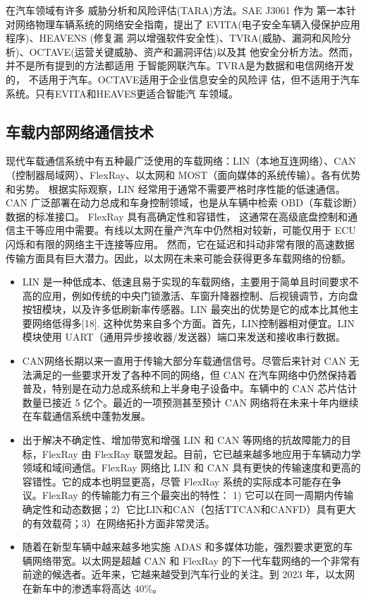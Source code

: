 在汽车领域有许多
威胁分析和风险评估(TARA)方法。SAE J3061
\cite{sae2016cybersecurity}作为
第一本针对网络物理车辆系统的网络安全指南，提出了
EVITA(电子安全车辆入侵保护应用程序)、HEAVENS (修复漏
洞以增强软件安全性)、TVRA(威胁、漏洞和风险分
析)、OCTAVE(运营关键威胁、资产和漏洞评估)以及其
他安全分析方法。然而，并不是所有提到的方法都适用
于智能网联汽车。TVRA是为数据和电信网络开发的，
不适用于汽车。OCTAVE适用于企业信息安全的风险评
估，但不适用于汽车系统。只有EVITA和HEAVES更适合智能汽
车领域。

\subsection{车载内部网络通信技术}
现代车载通信系统中有五种最广泛使用的车载网络：LIN（本地互连网络）、CAN（控制器局域网）、FlexRay、以太网和 MOST（面向媒体的系统传输）。各有优势和劣势。
根据实际观察，LIN 经常用于通常不需要严格时序性能的低速通信。CAN 广泛部署在动力总成和车身控制领域，也是从车辆中检索 OBD（车载诊断）数据的标准接口。
FlexRay 具有高确定性和容错性，
这通常在高级底盘控制和通信主干等应用中需要。有线以太网在量产汽车中仍然相对较新，可能仅用于 ECU 闪烁和有限的网络主干连接等应用。
然而，它在延迟和抖动非常有限的高速数据传输方面具有巨大潜力。因此，以太网在未来可能会获得更多车载网络的份额。

\begin{itemize}
    \item LIN 是一种低成本、低速且易于实现的车载网络，主要用于简单且时间要求不高的应用，例如传统的中央门锁激活、车窗升降器控制、后视镜调节，方向盘按钮模块，以及许多低刷新率传感器。LIN 最突出的优势是它的成本比其他主要网络低得多[18]. 这种优势来自多个方面。首先，LIN控制器相对便宜。LIN 模块使用 UART（通用异步接收器/发送器）端口来发送和接收串行数据。
    \item CAN网络长期以来一直用于传输大部分车载通信信号。尽管后来针对 CAN 无法满足的一些要求开发了各种不同的网络，但 CAN 在汽车网络中仍然保持着普及，特别是在动力总成系统和上半身电子设备中。车辆中的 CAN 芯片估计数量已接近 5 亿个。最近的一项预测甚至预计 CAN 网络将在未来十年内继续在车载通信系统中蓬勃发展。
    \item 出于解决不确定性、增加带宽和增强 LIN 和 CAN 等网络的抗故障能力的目标，FlexRay 由 FlexRay 联盟发起。目前，它已越来越多地应用于车辆动力学领域和域间通信。FlexRay 网络比 LIN 和 CAN 具有更快的传输速度和更高的容错性。它的成本也明显更高，尽管 FlexRay 系统的实际成本可能存在争议。FlexRay 的传输能力有三个最突出的特性： 1) 它可以在同一周期内传输确定性和动态数据；2）它比LIN和CAN（包括TTCAN和CANFD）具有更大的有效载荷；3）在网络拓扑方面非常灵活。
    \item 随着在新型车辆中越来越多地实施 ADAS 和多媒体功能，强烈要求更宽的车辆网络带宽。以太网是超越 CAN 和 FlexRay 的下一代车载网络的一个非常有前途的候选者。近年来，它越来越受到汽车行业的关注。到 2023 年，以太网在新车中的渗透率将高达 40\%。
\end{itemize}


